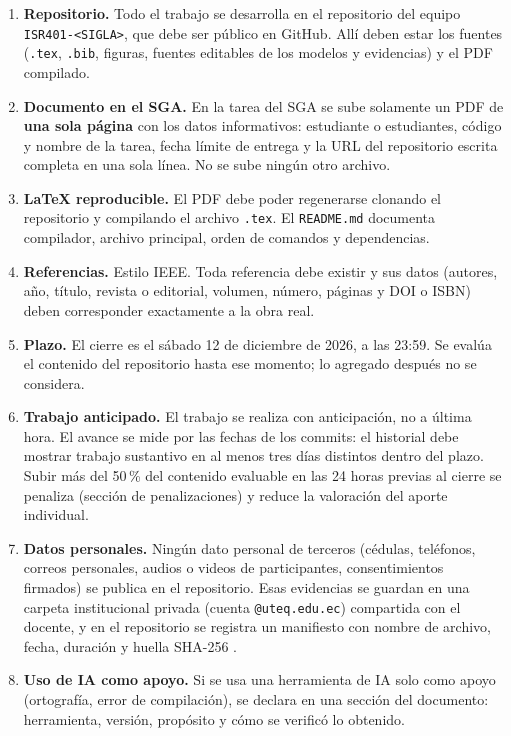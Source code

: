 \documentclass[11pt]{article}
\begin{document}
\begin{enumerate}[leftmargin=20pt,itemsep=3pt]
	\item \textbf{Repositorio.} Todo el trabajo se desarrolla en el repositorio del equipo \texttt{ISR401-<SIGLA>}, que debe ser público en GitHub. Allí deben estar los fuentes (\texttt{.tex}, \texttt{.bib}, figuras, fuentes editables de los modelos y evidencias) y el PDF compilado.
	\item \textbf{Documento en el SGA.} En la tarea del SGA se sube solamente un PDF de \textbf{una sola página} con los datos informativos: estudiante o estudiantes, código y nombre de la tarea, fecha límite de entrega y la URL del repositorio escrita completa en una sola línea. No se sube ningún otro archivo.
	\item \textbf{\LaTeX{} reproducible.} El PDF debe poder regenerarse clonando el repositorio y compilando el archivo \texttt{.tex}. El \texttt{README.md} documenta compilador, archivo principal, orden de comandos y dependencias.
	\item \textbf{Referencias.} Estilo IEEE. Toda referencia debe existir y sus datos (autores, año, título, revista o editorial, volumen, número, páginas y DOI o ISBN) deben corresponder exactamente a la obra real.
	\item \textbf{Plazo.} El cierre es el sábado 12 de diciembre de 2026, a las 23:59. Se evalúa el contenido del repositorio hasta ese momento; lo agregado después no se considera.
	\item \textbf{Trabajo anticipado.} El trabajo se realiza con anticipación, no a última hora. El avance se mide por las fechas de los commits: el historial debe mostrar trabajo sustantivo en al menos tres días distintos dentro del plazo. Subir más del 50\,\% del contenido evaluable en las 24 horas previas al cierre se penaliza (sección de penalizaciones) y reduce la valoración del aporte individual.
	\item \textbf{Datos personales.} Ningún dato personal de terceros (cédulas, teléfonos, correos personales, audios o videos de participantes, consentimientos firmados) se publica en el repositorio. Esas evidencias se guardan en una carpeta institucional privada (cuenta \texttt{@uteq.edu.ec}) compartida con el docente, y en el repositorio se registra un manifiesto con nombre de archivo, fecha, duración y huella SHA-256 \citep{lopdp_2021}.
	\item \textbf{Uso de IA como apoyo.} Si se usa una herramienta de IA solo como apoyo (ortografía, error de compilación), se declara en una sección del documento: herramienta, versión, propósito y cómo se verificó lo obtenido.
\end{enumerate}
\end{document}
